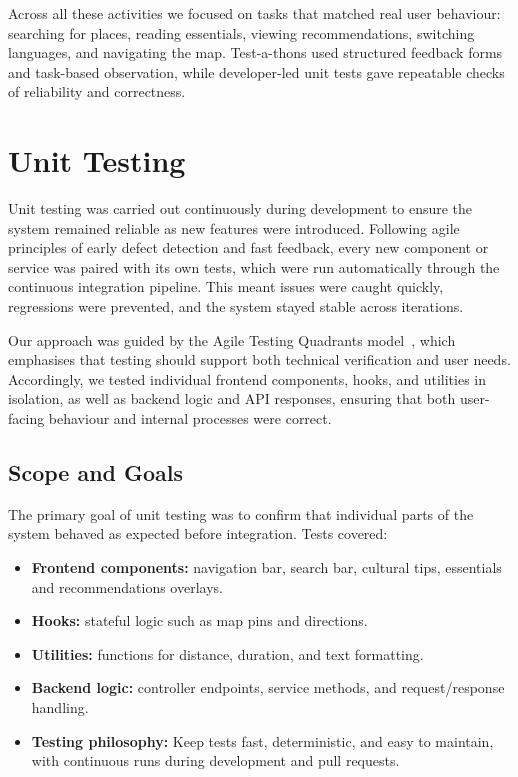 Across all these activities we focused on tasks that matched real user behaviour: searching for places, reading essentials, viewing recommendations, switching languages, and navigating the map. Test-a-thons used structured feedback forms and task-based observation, while developer-led unit tests gave repeatable checks of reliability and correctness.



\clearpage
\cleardoublepage
\section{Unit Testing}
\label{sec:Unit-testing}

Unit testing was carried out continuously during development to ensure the system remained reliable as new features were introduced. Following agile principles of early defect detection and fast feedback, every new component or service was paired with its own tests, which were run automatically through the continuous integration pipeline. This meant issues were caught quickly, regressions were prevented, and the system stayed stable across iterations.

Our approach was guided by the Agile Testing Quadrants model~\cite{Crispin2009AgileTesting}, which emphasises that testing should support both technical verification and user needs. Accordingly, we tested individual frontend components, hooks, and utilities in isolation, as well as backend logic and API responses, ensuring that both user-facing behaviour and internal processes were correct.

\subsection{Scope and Goals}
The primary goal of unit testing was to confirm that individual parts of the system behaved as expected before integration. Tests covered:
\begin{itemize} \itemsep0pt \parskip0pt
    \item \textbf{Frontend components:} navigation bar, search bar, cultural tips, essentials and recommendations overlays.
    \item \textbf{Hooks:} stateful logic such as map pins and directions.
    \item \textbf{Utilities:} functions for distance, duration, and text formatting.
    \item \textbf{Backend logic:} controller endpoints, service methods, and request/response handling.
    \item \textbf{Testing philosophy:} Keep tests fast, deterministic, and easy to maintain, with continuous runs during development and pull requests.

\end{itemize}

